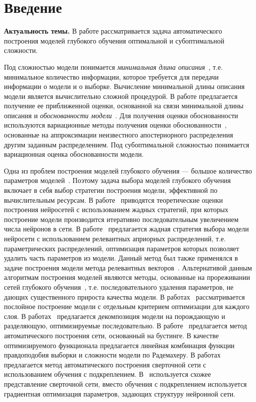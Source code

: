 \newpage{}
\chapter*{Введение}


\textbf{Актуальность темы.} В работе рассматривается задача автоматического построения моделей глубокого обучения оптимальной и субоптимальной сложности. 

Под сложностью модели понимается \emph{минимальная длина описания}~\cite{mdl}, т.е. минимальное количество информации, которое требуется для передачи информации о модели и о выборке. Вычисление минимальной длины описания модели является вычислительно сложной процедурой. В работе предлагается получение ее приближенной оценки, основанной на связи минимальной длины описания и \emph{обоснованности модели}~\cite{mdl}. Для получения оценки обоснованности используются вариационные методы получения оценки обоснованности~\cite{bishop}, основанные на аппроксимации неизвестного апостериорного распределения другим заданным распределением. Под субоптимальной сложностью понимается вариационная оценка обоснованности модели.

Одна из проблем построения моделей глубокого обучения --- большое количество параметров моделей~\cite{hinton_rbm, hinton_init}. Поэтому задача выбора моделей глубокого обучения включает в себя выбор стратегии построения модели, эффективной по вычислительным ресурсам. В работе~\cite{greed} приводятся теоретические оценки построения нейросетей с использованием жадных стратегий,  при которых построение модели производится итеративно последовательным увеличением числа нейронов в сети. В работе~\cite{greed_mlp} предлагается жадная стратегия выбора модели нейросети с использованием релевантных априорных распределений, т.е. параметрических распределений, оптимизация параметров которых позволяет удалить часть параметров из модели. Данный метод был также применялся в задаче построения модели метода релевантных векторов~\cite{rvm}. Альтернативой данным алгоритмам построения моделей являются методы, основанные на прореживании сетей глубокого обучения~\cite{obd, popova, nvidia_prune}, т.е. последовательного удаления параметров, не дающих существенного прироста качества модели. 
В работах~\cite{Bengio, hd} рассматривается послойное построение модели с отдельным критерием оптимизации для каждого слоя. В работах~\cite{Kingma, gendis_pictures, gendis_phd} предлагается декомпозиция модели на порождающую и разделяющую, оптимизируемые последовательно. В работе~\cite{adanet} предлагается метод автоматического построения сети, основанный на бустинге. В качестве оптимизируемого функционала предлагается линейная комбинация функции правдоподобия выборки и сложности модели по Радемахеру. 
В работах~\cite{reinf,reinf_predict,reinf_deep2net,reinf_transfer} предлагается метод автоматического построения сверточной сети с использованием обучения с подкреплением. В~\cite{darts} используется схожее представление сверточной сети, вместо обучения с подкреплением используется градиентная оптимизация параметров, задающих структуру нейронной сети.

